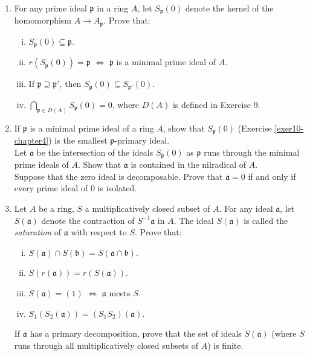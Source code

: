 \begin{enumerate}
    \item \label{exer10-chapter4}For any prime ideal $\mathfrak{p}$ in a ring $A$, let $S_{\mathfrak{p}}(0)$ denote the kernel of the homomorphism $A \to A_{\mathfrak{p}}$. Prove that:
    \begin{enumerate}[i)]
        \item $S_{\mathfrak{p}}(0) \subseteq \mathfrak{p}$.
        \item $r(S_{\mathfrak{p}}(0)) = \mathfrak{p}$ $\iff$ $\mathfrak{p}$ is a minimal prime ideal of $A$.
        \item If $\mathfrak{p} \supseteq \mathfrak{p}'$, then $S_{\mathfrak{p}}(0) \subseteq S_{\mathfrak{p}'}(0)$.
        \item $\bigcap_{\mathfrak{p} \in D(A)} S_{\mathfrak{p}}(0) = 0$, where $D(A)$ is defined in Exercise 9.
    \end{enumerate}

    \item \label{exer11-chapter4}If $\mathfrak{p}$ is a minimal prime ideal of a ring $A$, show that $S_{\mathfrak{p}}(0)$ (Exercise \ref{exer10-chapter4}) is the smallest $\mathfrak{p}$-primary ideal.\\
    Let $\mathfrak{a}$ be the intersection of the ideals $S_{\mathfrak{p}}(0)$ as $\mathfrak{p}$ runs through the minimal prime ideals of $A$. Show that $\mathfrak{a}$ is contained in the nilradical of $A$.\\
    Suppose that the zero ideal is decomposable. Prove that $\mathfrak{a} = 0$ if and only if every prime ideal of $0$ is isolated.

    \item \label{exer12-chapter4}Let $A$ be a ring, $S$ a multiplicatively closed subset of $A$. For any ideal $\mathfrak{a}$, let $S(\mathfrak{a})$ denote the contraction of $S^{-1}\mathfrak{a}$ in $A$. The ideal $S(\mathfrak{a})$ is called the \emph{saturation} of $\mathfrak{a}$ with respect to $S$. Prove that:
    \begin{enumerate}[i)]
        \item $S(\mathfrak{a}) \cap S(\mathfrak{b}) = S(\mathfrak{a} \cap \mathfrak{b})$.
        \item $S(r(\mathfrak{a})) = r(S(\mathfrak{a}))$.
        \item $S(\mathfrak{a}) = (1)$ $\iff$ $\mathfrak{a}$ meets $S$.
        \item $S_1(S_2(\mathfrak{a})) = (S_1 S_2)(\mathfrak{a})$.
    \end{enumerate}
    If $\mathfrak{a}$ has a primary decomposition, prove that the set of ideals $S(\mathfrak{a})$ (where $S$ runs through all multiplicatively closed subsets of $A$) is finite.


\end{enumerate}
